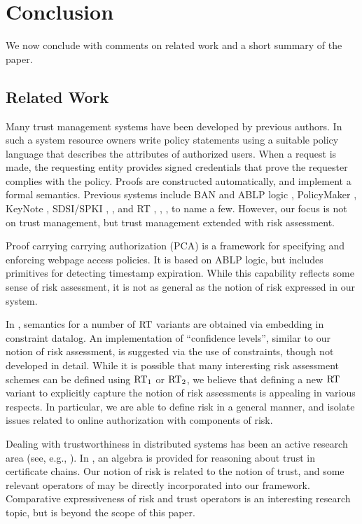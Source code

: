 \section{Conclusion}
\label{section-conclusion}

We now conclude with comments on related work and a short summary of
the paper.

\subsection{Related Work}

Many trust management systems have been developed by previous
authors. In such a system resource owners write policy statements
using a suitable policy language that describes the attributes of
authorized users. When a request is made, the requesting entity
provides signed credentials that prove the requester complies with the
policy.  Proofs are constructed automatically, and implement a formal
semantics.  Previous systems include BAN \cite{BAN} and ABLP logic
\cite{ABLP93}, PolicyMaker \cite{Blaze96a}, KeyNote \cite{RFC-2704},
SDSI/SPKI \cite{rivest-lampson-96}, \cite{ellison-etal-rfc99}, and RT
\cite{Li:2002-05}, \cite{Li:2003-02}, \cite{Li:2003-04}, to name a
few.  However, our focus is not on trust management, but 
trust management extended with risk assessment.

Proof carrying carrying authorization (PCA)
\cite{bauer-phd,Appel99ccs} is a framework for specifying and
enforcing webpage access policies.  It is based on ABLP logic, but
includes primitives for detecting timestamp expiration.  While this
capability reflects some sense of risk assessment, it is not as
general as the notion of risk expressed in our system.

In \cite{anderson-ms-thesis}, semantics for a number of $\text{RT}$ variants
are obtained via embedding in constraint datalog.  An implementation
of ``confidence levels'', similar to our notion of risk assessment, is
suggested via the use of constraints, though not developed in detail.
While it is possible that many interesting risk assessment schemes can
be defined using $\text{RT}_1$ or $\text{RT}_2$, we believe that defining a new
$\text{RT}$ variant to explicitly capture the notion of risk assessments is
appealing in various respects.  In particular, we are able to define
risk in a general manner, and isolate issues related to online
authorization with components of risk.

Dealing with trustworthiness in distributed systems has been an active
research area (see, e.g., \cite{grandison-ieeecst00}). In
\cite{josang-ndss99}, an algebra is provided for reasoning about trust
in certificate chains. Our notion of risk is related to the notion of
trust, and some relevant operators of \cite{josang-ndss99} may be
directly incorporated into our framework.  Comparative expressiveness
of risk and trust operators is an interesting research topic, but
is beyond the scope of this paper.
 
